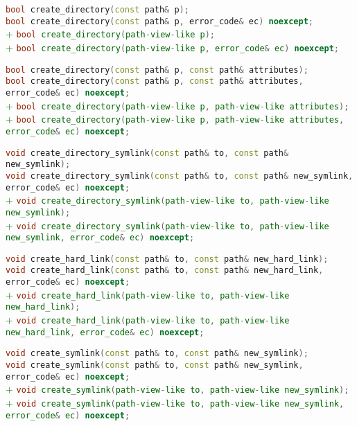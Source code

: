 \documentclass[11pt]{article}
\newcommand{\code}[2][cpp]{\lstinline[language=#1,basicstyle=\small\ttfamily]{#2}}
\newcommand{\tsreplace}[3]{\textcolor{red}{\sout{#1}}#2\textcolor{darkgreen}{#3}}
\begin{document}
\tsreplace{}{  \code{bool create_directory(const path& p);}}{}\\
\tsreplace{}{  \code{bool create_directory(const path& p, error_code& ec) noexcept;}}{}\\
\tsreplace{}{}{+ \code{bool create_directory(path-view-like p);}}\\
\tsreplace{}{}{+ \code{bool create_directory(path-view-like p, error_code& ec) noexcept;}}

\tsreplace{}{  \code{bool create_directory(const path& p, const path& attributes);}}{}\\
\tsreplace{}{  \code{bool create_directory(const path& p, const path& attributes, error_code& ec) noexcept;}}{}\\
\tsreplace{}{}{+ \code{bool create_directory(path-view-like p, path-view-like attributes);}}\\
\tsreplace{}{}{+ \code{bool create_directory(path-view-like p, path-view-like attributes, error_code& ec) noexcept;}}

\tsreplace{}{  \code{void create_directory_symlink(const path& to, const path& new_symlink);}}{}\\
\tsreplace{}{  \code{void create_directory_symlink(const path& to, const path& new_symlink, error_code& ec) noexcept;}}{}\\
\tsreplace{}{}{+ \code{void create_directory_symlink(path-view-like to, path-view-like new_symlink);}}\\
\tsreplace{}{}{+ \code{void create_directory_symlink(path-view-like to, path-view-like new_symlink, error_code& ec) noexcept;}}

\tsreplace{}{  \code{void create_hard_link(const path& to, const path& new_hard_link);}}{}\\
\tsreplace{}{  \code{void create_hard_link(const path& to, const path& new_hard_link, error_code& ec) noexcept;}}{}\\
\tsreplace{}{}{+ \code{void create_hard_link(path-view-like to, path-view-like new_hard_link);}}\\
\tsreplace{}{}{+ \code{void create_hard_link(path-view-like to, path-view-like new_hard_link, error_code& ec) noexcept;}}

\tsreplace{}{  \code{void create_symlink(const path& to, const path& new_symlink);}}{}\\
\tsreplace{}{  \code{void create_symlink(const path& to, const path& new_symlink, error_code& ec) noexcept;}}{}\\
\tsreplace{}{}{+ \code{void create_symlink(path-view-like to, path-view-like new_symlink);}}\\
\tsreplace{}{}{+ \code{void create_symlink(path-view-like to, path-view-like new_symlink, error_code& ec) noexcept;}}
\end{document}
